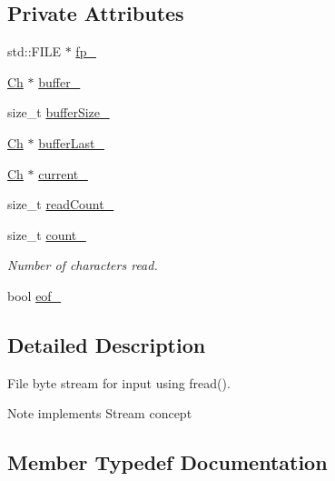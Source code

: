 \subsection*{Private Attributes}
\begin{DoxyCompactItemize}
\item 
std\+::\+F\+I\+LE $\ast$ \hyperlink{classFileReadStream_a47dc4f7f100bcc02a02e619f9b494a62}{fp\+\_\+}
\item 
\hyperlink{classFileReadStream_ae1f83d9ca3c76d1d151af0b6c427f046}{Ch} $\ast$ \hyperlink{classFileReadStream_a1b5563bcaa959d95f9bc3511a73ebbad}{buffer\+\_\+}
\item 
size\+\_\+t \hyperlink{classFileReadStream_af65abe97e76c94c7f0f6419f94e9105f}{buffer\+Size\+\_\+}
\item 
\hyperlink{classFileReadStream_ae1f83d9ca3c76d1d151af0b6c427f046}{Ch} $\ast$ \hyperlink{classFileReadStream_a5affa127604e77646d7acc94432c7e59}{buffer\+Last\+\_\+}
\item 
\hyperlink{classFileReadStream_ae1f83d9ca3c76d1d151af0b6c427f046}{Ch} $\ast$ \hyperlink{classFileReadStream_a0c7b4824d8742960eba2ac81c1e6b662}{current\+\_\+}
\item 
size\+\_\+t \hyperlink{classFileReadStream_a1b1a7cadb599e83b1f781c0b16d4ed50}{read\+Count\+\_\+}
\item 
size\+\_\+t \hyperlink{classFileReadStream_a55018d0ad821b9ea01e0ec5001008ab2}{count\+\_\+}
\begin{DoxyCompactList}\small\item\em Number of characters read. \end{DoxyCompactList}\item 
bool \hyperlink{classFileReadStream_a02a64d8fc7a4df830834f756b8ac08af}{eof\+\_\+}
\end{DoxyCompactItemize}


\subsection{Detailed Description}
File byte stream for input using fread(). 

\begin{DoxyNote}{Note}
implements Stream concept 
\end{DoxyNote}


\subsection{Member Typedef Documentation}
\mbox{\label{classFileReadStream_ae1f83d9ca3c76d1d151af0b6c427f046}} 
